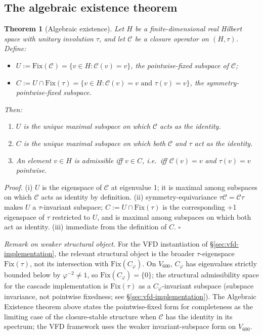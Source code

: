 \documentclass[11pt]{article}
\theoremstyle{plain}
\newtheorem{theorem}{Theorem}[section]
\theoremstyle{definition}
\theoremstyle{remark}
\newcommand{\Ccal}{\mathcal{C}}
\newcommand{\Fix}{\mathrm{Fix}}
\newcommand{\Cph}{C_\varphi}
\begin{document}
\subsection{The algebraic existence theorem}

\begin{theorem}[Algebraic existence]\label{thm:existence}
Let $H$ be a finite-dimensional real Hilbert space with unitary involution $\tau$, and let $\Ccal$ be a closure operator on $(H, \tau)$. Define:
\begin{itemize}[leftmargin=2em]
\item $U := \Fix(\Ccal) = \{ v \in H : \Ccal(v) = v \}$, the pointwise-fixed subspace of $\Ccal$;
\item $C := U \cap \Fix(\tau) = \{ v \in H : \Ccal(v) = v \text{ and } \tau(v) = v\}$, the symmetry-pointwise-fixed subspace.
\end{itemize}
Then:
\begin{enumerate}[leftmargin=2em]
\item[(i)] $U$ is the unique maximal subspace on which $\Ccal$ acts as the identity.
\item[(ii)] $C$ is the unique maximal subspace on which both $\Ccal$ and $\tau$ act as the identity.
\item[(iii)] An element $v \in H$ is \emph{admissible} iff $v \in C$, i.e.\ iff $\Ccal(v) = v$ and $\tau(v) = v$ pointwise.
\end{enumerate}
\end{theorem}

\noindent\emph{Proof.} (i) $U$ is the eigenspace of $\Ccal$ at eigenvalue 1; it is maximal among subspaces on which $\Ccal$ acts as identity by definition. (ii) symmetry-equivariance $\tau\Ccal = \Ccal\tau$ makes $U$ a $\tau$-invariant subspace; $C := U \cap \Fix(\tau)$ is the corresponding +1 eigenspace of $\tau$ restricted to $U$, and is maximal among subspaces on which both act as identity. (iii) immediate from the definition of $C$. \hfill$\square$

\noindent\emph{Remark on weaker structural object.} For the VFD instantiation of \S\ref{sec:vfd-implementation}, the relevant structural object is the broader $\tau$-eigenspace $\Fix(\tau)$, not its intersection with $\Fix(\Cph)$. On $V_{600}$, $\Cph$ has eigenvalues strictly bounded below by $\varphi^{-2} \neq 1$, so $\Fix(\Cph) = \{0\}$; the structural admissibility space for the cascade implementation is $\Fix(\tau)$ as a $\Cph$-invariant subspace (subspace invariance, not pointwise fixedness; see \S\ref{sec:vfd-implementation}). The Algebraic Existence theorem above states the pointwise-fixed form for completeness as the limiting case of the closure-stable structure when $\Ccal$ has the identity in its spectrum; the VFD framework uses the weaker invariant-subspace form on $V_{600}$.
\end{document}
